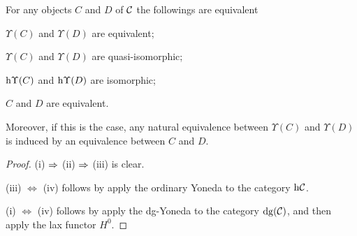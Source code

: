 \begin{proposition}\label{prop:homotopyYoneda}
For any objects $C$ and $D$ of ${\cal C}$ the followings are equivalent
\begin{proplist}
\item 
$\Upsilon(C)$ and $\Upsilon(D)$ are equivalent;
\item 
$\Upsilon(C)$ and $\Upsilon(D)$ are quasi-isomorphic;
\item 
$\mathrm{h}\Upsilon(C)$ and $\mathrm{h}\Upsilon(D)$ are isomorphic;
\item 
$C$ and $D$ are equivalent.
\end{proplist}
Moreover, if this is the case, 
any natural equivalence between 
$\Upsilon(C)$ and $\Upsilon(D)$ 
is induced by an equivalence 
between $C$ and $D$.
\end{proposition}
\begin{proof}
(i) $\Rightarrow$ (ii) $\Rightarrow$ (iii) is clear. 

(iii) $\Leftrightarrow$ (iv) follows by 
apply the ordinary Yoneda to the category $\mathrm{h}{\cal C}$.

(i) $\Leftrightarrow$ (iv) follows by 
apply the dg-Yoneda to the category $\mathrm{dg}({\cal C})$, 
and then apply the lax functor $H^0$.
\end{proof}
















\clearpage

